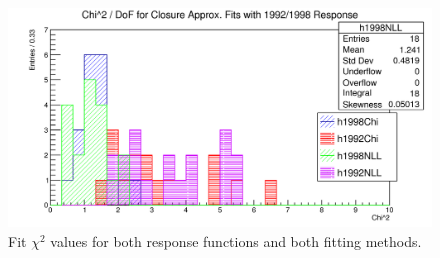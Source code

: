 \begin{figure}[h]
  \centering
  \includegraphics[width=\linewidth]{figures/png/chiSq_of_fits.png}
  \caption{Fit $\chi^2$ values for both response functions and both fitting methods. }
  \label{fig:ChiSqOfFits}
\end{figure}



